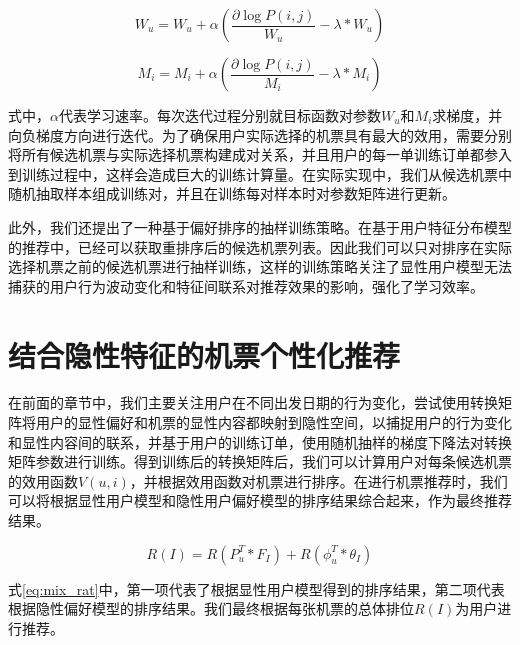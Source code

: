 \begin{equation}
	W_u = W_u + \alpha(\frac{\partial \log P(i,j)}{W_u} - \lambda*W_u)
\end{equation}

\begin{equation}
	M_i = M_i + \alpha(\frac{\partial \log P(i,j)}{M_i} - \lambda*M_i)
\end{equation}

式中，$\alpha$代表学习速率。每次迭代过程分别就目标函数对参数$W_u$和$M_i$求梯度，并向负梯度方向进行迭代。为了确保用户实际选择的机票具有最大的效用，需要分别将所有候选机票与实际选择机票构建成对关系，并且用户的每一单训练订单都参入到训练过程中，这样会造成巨大的训练计算量。在实际实现中，我们从候选机票中随机抽取样本组成训练对，并且在训练每对样本时对参数矩阵进行更新。

此外，我们还提出了一种基于偏好排序的抽样训练策略。在基于用户特征分布模型的推荐中，已经可以获取重排序后的候选机票列表。因此我们可以只对排序在实际选择机票之前的候选机票进行抽样训练，这样的训练策略关注了显性用户模型无法捕获的用户行为波动变化和特征间联系对推荐效果的影响，强化了学习效率。

\section{结合隐性特征的机票个性化推荐}

在前面的章节中，我们主要关注用户在不同出发日期的行为变化，尝试使用转换矩阵将用户的显性偏好和机票的显性内容都映射到隐性空间，以捕捉用户的行为变化和显性内容间的联系，并基于用户的训练订单，使用随机抽样的梯度下降法对转换矩阵参数进行训练。得到训练后的转换矩阵后，我们可以计算用户对每条候选机票的效用函数$V(u,i)$，并根据效用函数对机票进行排序。在进行机票推荐时，我们可以将根据显性用户模型和隐性用户偏好模型的排序结果综合起来，作为最终推荐结果。

\begin{equation}
\label{eq:mix_rat}
	R(I) = R(P_u^T * F_I) + R(\phi_u^T * \theta_I)
\end{equation}

式\ref{eq:mix_rat}中，第一项代表了根据显性用户模型得到的排序结果，第二项代表根据隐性偏好模型的排序结果。我们最终根据每张机票的总体排位$R(I)$为用户进行推荐。

